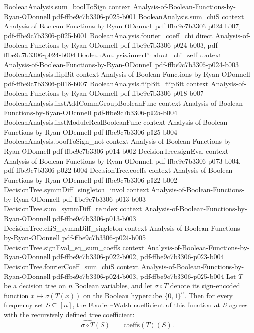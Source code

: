 \begin{theorem}
\proofstep
  {BooleanAnalysis.sum_boolToSign}
  {context}
  {Analysis-of-Boolean-Functions-by-Ryan-ODonnell}
  {pdf-ffbe9c7b3306-p025-b001}
\proofstep
  {BooleanAnalysis.sum_chiS}
  {context}
  {Analysis-of-Boolean-Functions-by-Ryan-ODonnell}
  {pdf-ffbe9c7b3306-p024-b007,
    pdf-ffbe9c7b3306-p025-b001}
\proofstep
  {BooleanAnalysis.fourier_coeff_chi}
  {direct}
  {Analysis-of-Boolean-Functions-by-Ryan-ODonnell}
  {pdf-ffbe9c7b3306-p024-b003,
    pdf-ffbe9c7b3306-p024-b004}
\proofstep
  {BooleanAnalysis.innerProduct_chi_self}
  {context}
  {Analysis-of-Boolean-Functions-by-Ryan-ODonnell}
  {pdf-ffbe9c7b3306-p024-b003}
\proofstep
  {BooleanAnalysis.flipBit}
  {context}
  {Analysis-of-Boolean-Functions-by-Ryan-ODonnell}
  {pdf-ffbe9c7b3306-p018-b007}
\proofstep
  {BooleanAnalysis.flipBit_flipBit}
  {context}
  {Analysis-of-Boolean-Functions-by-Ryan-ODonnell}
  {pdf-ffbe9c7b3306-p018-b007}
\proofstep
  {BooleanAnalysis.instAddCommGroupBooleanFunc}
  {context}
  {Analysis-of-Boolean-Functions-by-Ryan-ODonnell}
  {pdf-ffbe9c7b3306-p025-b004}
\proofstep
  {BooleanAnalysis.instModuleRealBooleanFunc}
  {context}
  {Analysis-of-Boolean-Functions-by-Ryan-ODonnell}
  {pdf-ffbe9c7b3306-p025-b004}
\proofstep
  {BooleanAnalysis.boolToSign_not}
  {context}
  {Analysis-of-Boolean-Functions-by-Ryan-ODonnell}
  {pdf-ffbe9c7b3306-p014-b002}
\proofstep
  {DecisionTree.signEval}
  {context}
  {Analysis-of-Boolean-Functions-by-Ryan-ODonnell}
  {pdf-ffbe9c7b3306-p073-b004,
    pdf-ffbe9c7b3306-p022-b004}
\proofstep
  {DecisionTree.coeffs}
  {context}
  {Analysis-of-Boolean-Functions-by-Ryan-ODonnell}
  {pdf-ffbe9c7b3306-p022-b002}
\proofstep
  {DecisionTree.symmDiff_singleton_invol}
  {context}
  {Analysis-of-Boolean-Functions-by-Ryan-ODonnell}
  {pdf-ffbe9c7b3306-p013-b003}
\proofstep
  {DecisionTree.sum_symmDiff_reindex}
  {context}
  {Analysis-of-Boolean-Functions-by-Ryan-ODonnell}
  {pdf-ffbe9c7b3306-p013-b003}
\proofstep
  {DecisionTree.chiS_symmDiff_singleton}
  {context}
  {Analysis-of-Boolean-Functions-by-Ryan-ODonnell}
  {pdf-ffbe9c7b3306-p024-b005}
\proofstep
  {DecisionTree.signEval_eq_sum_coeffs}
  {context}
  {Analysis-of-Boolean-Functions-by-Ryan-ODonnell}
  {pdf-ffbe9c7b3306-p022-b002,
    pdf-ffbe9c7b3306-p023-b004}
\proofstep
  {DecisionTree.fourierCoeff_sum_chiS}
  {context}
  {Analysis-of-Boolean-Functions-by-Ryan-ODonnell}
  {pdf-ffbe9c7b3306-p024-b003,
    pdf-ffbe9c7b3306-p025-b004}
Let $T$ be a decision tree on $n$ Boolean variables, and let $\sigma\!\circ\! T$ denote
its sign-encoded function $x \mapsto \sigma(T(x))$ on the Boolean hypercube $\{0,1\}^n$.
Then for every frequency set $S \subseteq [n]$, the Fourier–Walsh coefficient of this
function at $S$ agrees with the recursively defined tree coefficient:
\[
  \widehat{\sigma\!\circ\! T}(S) \;=\; \mathrm{coeffs}(T)(S).
\]
\end{theorem}

